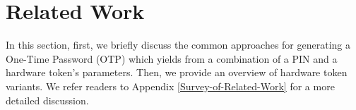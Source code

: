 
\vspace{-5mm}
\section{Related Work}

\vspace{-2mm}



%
%
%


In this section, first, we briefly discuss the common approaches for generating a One-Time Password (OTP) which yields from a combination of a PIN and a hardware token's parameters.  Then, we provide an overview of hardware token variants. We refer readers to Appendix \ref{Survey-of-Related-Work} for a more detailed discussion. 


